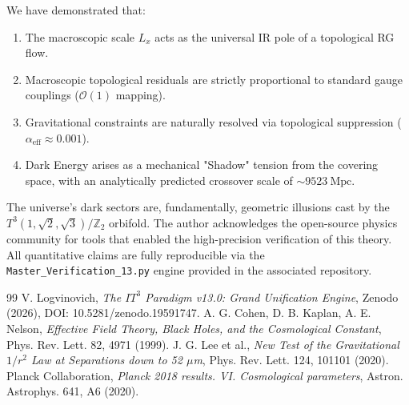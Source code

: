 \documentclass[aps,prd,twocolumn,groupedaddress,superscriptaddress,amsmath,amssymb]{revtex4-2}
\begin{document}
We have demonstrated that:
\begin{enumerate}
    \item The macroscopic scale $L_x$ acts as the universal IR pole of a topological RG flow.
    \item Macroscopic topological residuals are strictly proportional to standard gauge couplings ($\mathcal{O}(1)$ mapping).
    \item Gravitational constraints are naturally resolved via topological suppression ($\alpha_{\text{eff}} \approx 0.001$).
    \item Dark Energy arises as a mechanical "Shadow" tension from the covering space, with an analytically predicted crossover scale of $\sim 9523~\text{Mpc}$.
\end{enumerate}

The universe's dark sectors are, fundamentally, geometric illusions cast by the $T^3(1,\sqrt{2},\sqrt{3})/\mathbb{Z}_2$ orbifold. The author acknowledges the open-source physics community for tools that enabled the high-precision verification of this theory. All quantitative claims are fully reproducible via the \texttt{Master\_Verification\_13.py} engine provided in the associated repository.

\begin{thebibliography}{99}
 V. Logvinovich, \textit{The $IT^3$ Paradigm v13.0: Grand Unification Engine}, Zenodo (2026), DOI: 10.5281/zenodo.19591747.
 A. G. Cohen, D. B. Kaplan, A. E. Nelson, \textit{Effective Field Theory, Black Holes, and the Cosmological Constant}, Phys. Rev. Lett. 82, 4971 (1999).
 J. G. Lee et al., \textit{New Test of the Gravitational $1/r^2$ Law at Separations down to 52 $\mu$m}, Phys. Rev. Lett. 124, 101101 (2020).
 Planck Collaboration, \textit{Planck 2018 results. VI. Cosmological parameters}, Astron. Astrophys. 641, A6 (2020).
\end{thebibliography}
\end{document}

